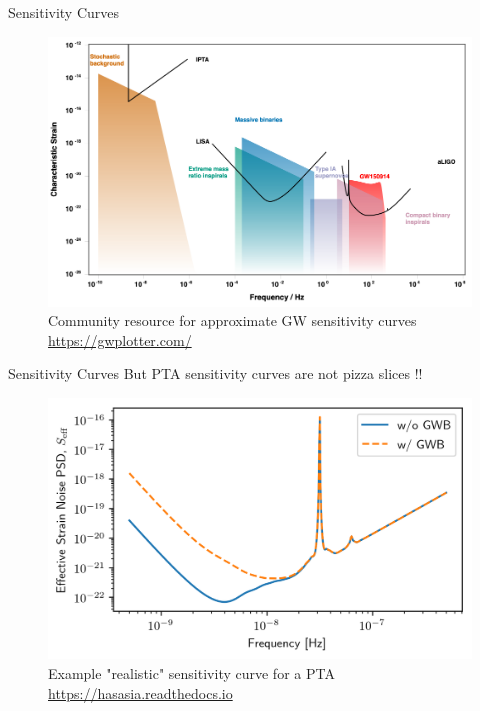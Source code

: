 \documentclass{beamer}
\begin{document}
\begin{frame}{Sensitivity Curves}
    \begin{figure}
        \centering
        \includegraphics[width=\linewidth]{figs/gwplotter.png}
        \caption{Community resource for approximate GW sensitivity curves
        \centering \url{https://gwplotter.com/}
        }
        \label{fig:sensitivity_curve}
    \end{figure}
\end{frame}

\begin{frame}{Sensitivity Curves}
    But PTA sensitivity curves are not pizza slices !!
    \begin{figure}
        \centering
        \includegraphics[width=\linewidth]{figs/example_sensitivity_curve.png}
        \caption{Example "realistic" sensitivity curve for a PTA
        \centering \url{https://hasasia.readthedocs.io}
        }
        \label{fig:pta_sensitivity_curve}
    \end{figure}
\end{frame}
\end{document}
